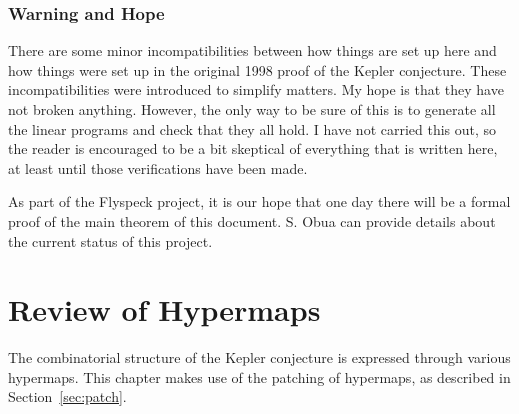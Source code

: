 \subsubsection{Warning and Hope}

There are some minor incompatibilities between how things are set
up here and how things were set up in the original 1998 proof of
the Kepler conjecture.  These incompatibilities were introduced to
simplify matters.  My hope is that they have not broken anything.
However, the only way to be sure of this is to generate all the
linear programs and check that they all hold.  I have not carried
this out, so the reader is encouraged to be a bit skeptical of
everything that is written here, at least until those
verifications have been made.

As part of the Flyspeck project, it is our hope that one day there
will be a formal proof of the main theorem of this document.  S.
Obua can provide details about the current status of this project.

\section{Review of Hypermaps}

The combinatorial structure of the Kepler conjecture is expressed
through various hypermaps.   This chapter makes use of
the patching of hypermaps, as described in Section~\ref{sec:patch}.

